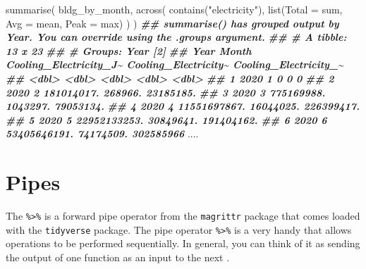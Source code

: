 \documentclass[
]{book}
\newenvironment{Shaded}{\begin{snugshade}}{\end{snugshade}}
\newcommand{\AttributeTok}[1]{\textcolor[rgb]{0.77,0.63,0.00}{#1}}
\newcommand{\DocumentationTok}[1]{\textcolor[rgb]{0.56,0.35,0.01}{\textbf{\textit{#1}}}}
\newcommand{\FunctionTok}[1]{\textcolor[rgb]{0.00,0.00,0.00}{#1}}
\newcommand{\NormalTok}[1]{#1}
\newcommand{\StringTok}[1]{\textcolor[rgb]{0.31,0.60,0.02}{#1}}
\begin{document}
\begin{Shaded}
\begin{Highlighting}[]

\FunctionTok{summarise}\NormalTok{(}
\NormalTok{  bldg\_by\_month,}
  \FunctionTok{across}\NormalTok{(}
    \FunctionTok{contains}\NormalTok{(}\StringTok{"electricity"}\NormalTok{),}
    \FunctionTok{list}\NormalTok{(}\AttributeTok{Total =}\NormalTok{ sum, }\AttributeTok{Avg =}\NormalTok{ mean, }\AttributeTok{Peak =}\NormalTok{ max)}
\NormalTok{  )}
\NormalTok{)}
\DocumentationTok{\#\# \textasciigrave{}summarise()\textasciigrave{} has grouped output by \textquotesingle{}Year\textquotesingle{}. You can override using the \textasciigrave{}.groups\textasciigrave{} argument.}
\DocumentationTok{\#\# \# A tibble: 13 x 23}
\DocumentationTok{\#\# \# Groups:   Year [2]}
\DocumentationTok{\#\#     Year Month Cooling\_Electricity\_J\textasciitilde{} Cooling\_Electricity\textasciitilde{} Cooling\_Electricity\_\textasciitilde{}}
\DocumentationTok{\#\#    \textless{}dbl\textgreater{} \textless{}dbl\textgreater{}                  \textless{}dbl\textgreater{}                \textless{}dbl\textgreater{}                 \textless{}dbl\textgreater{}}
\DocumentationTok{\#\#  1  2020     1                     0                    0                     0 }
\DocumentationTok{\#\#  2  2020     2             181014017.              268966.             23185185.}
\DocumentationTok{\#\#  3  2020     3             775169988.             1043297.             79053134.}
\DocumentationTok{\#\#  4  2020     4           11551697867.            16044025.            226399417.}
\DocumentationTok{\#\#  5  2020     5           22952133253.            30849641.            191404162.}
\DocumentationTok{\#\#  6  2020     6           53405646191.            74174509.            302585966 }
\NormalTok{....}
\end{Highlighting}
\end{Shaded}

\hypertarget{pipes}{%
\section{Pipes}\label{pipes}}

The \texttt{\%\textgreater{}\%} is a forward pipe operator from the \texttt{magrittr} package that comes loaded with the \texttt{tidyverse} package. The pipe operator \texttt{\%\textgreater{}\%} is a very handy that allows operations to be performed sequentially. In general, you can think of it as sending the output of one function as an input to the next .
\end{document}
